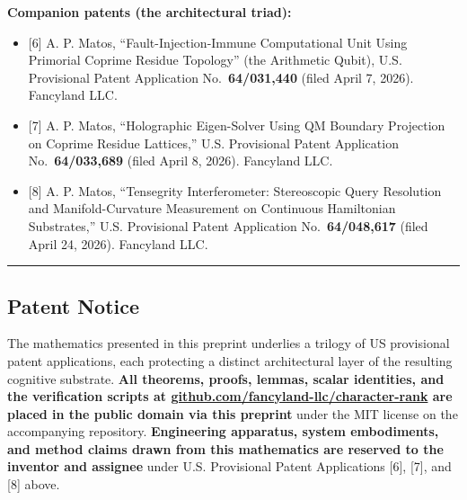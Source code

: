 \documentclass[
  11pt,
]{article}
\providecommand{\tightlist}{%
  \setlength{\itemsep}{0pt}\setlength{\parskip}{0pt}}
\begin{document}
\textbf{Companion patents (the architectural triad):}

\begin{itemize}
\tightlist
\item
  {[}6{]} A. P. Matos, ``Fault-Injection-Immune Computational Unit Using
  Primorial Coprime Residue Topology'' (the Arithmetic Qubit), U.S.
  Provisional Patent Application No.~\textbf{64/031,440} (filed April 7,
  2026). Fancyland LLC.
\item
  {[}7{]} A. P. Matos, ``Holographic Eigen-Solver Using QM Boundary
  Projection on Coprime Residue Lattices,'' U.S. Provisional Patent
  Application No.~\textbf{64/033,689} (filed April 8, 2026). Fancyland
  LLC.
\item
  {[}8{]} A. P. Matos, ``Tensegrity Interferometer: Stereoscopic Query
  Resolution and Manifold-Curvature Measurement on Continuous
  Hamiltonian Substrates,'' U.S. Provisional Patent Application
  No.~\textbf{64/048,617} (filed April 24, 2026). Fancyland LLC.
\end{itemize}

\begin{center}\rule{0.5\linewidth}{0.5pt}\end{center}

\subsection{Patent Notice}\label{patent-notice}

The mathematics presented in this preprint underlies a trilogy of US
provisional patent applications, each protecting a distinct
architectural layer of the resulting cognitive substrate. \textbf{All
theorems, proofs, lemmas, scalar identities, and the verification
scripts at
\href{https://github.com/fancyland-llc/character-rank}{github.com/fancyland-llc/character-rank}
are placed in the public domain via this preprint} under the MIT license
on the accompanying repository. \textbf{Engineering apparatus, system
embodiments, and method claims drawn from this mathematics are reserved
to the inventor and assignee} under U.S. Provisional Patent Applications
{[}6{]}, {[}7{]}, and {[}8{]} above.
\end{document}
